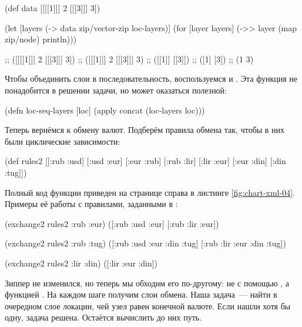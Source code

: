 \begin{english}
  \begin{clojure}
(def data
  [[[[1]]] 2 [[[3]]] 3])

(let [layers (-> data
                 zip/vector-zip
                 loc-layers)]
  (for [layer layers]
    (->> layer
         (map zip/node)
         println)))

;; ([[[[1]]] 2 [[[3]]] 3])
;; ([[[1]]] 2 [[[3]]] 3)
;; ([[1]] [[3]])
;; ([1] [3])
;; (1 3)
  \end{clojure}
\end{english}

Чтобы объединить слои в последовательность, воспользуемся  и
. Эта функция не понадобится в решении задачи, но может оказаться
полезной:

\begin{english}
  \begin{clojure}
(defn loc-seq-layers [loc]
  (apply concat (loc-layers loc)))
  \end{clojure}
\end{english}

Теперь вернёмся к обмену валют. Подберём правила обмена так, чтобы в них были
циклические зависимости:


\begin{english}
  \begin{clojure}
(def rules2
  [[:rub :usd]
   [:usd :eur]
   [:eur :rub]
   [:rub :lir]
   [:lir :eur]
   [:eur :din]
   [:din :tug]])
  \end{clojure}
\end{english}

Полный код функции  приведен на странице справа в листинге
\ref{fig:chart-xml-04}. Примеры её работы с правилами, заданными в
:

\begin{english}
  \begin{clojure}
(exchange2 rules2 :rub :eur)
([:rub :usd :eur]
 [:rub :lir :eur])

(exchange2 rules2 :rub :tug)
([:rub :usd :eur :din :tug]
 [:rub :lir :eur :din :tug])

(exchange2 rules2 :lir :din)
([:lir :eur :din])
  \end{clojure}
\end{english}

Зиппер не изменился, но теперь мы обходим его по-другому: не с помощью
, а функцией . На каждом шаге получим слои
обмена. Наша задача~--- найти в очередном слое локации, чей узел равен конечной
валюте. Если нашли хотя бы одну, задача решена. Остаётся вычислить до них путь.

